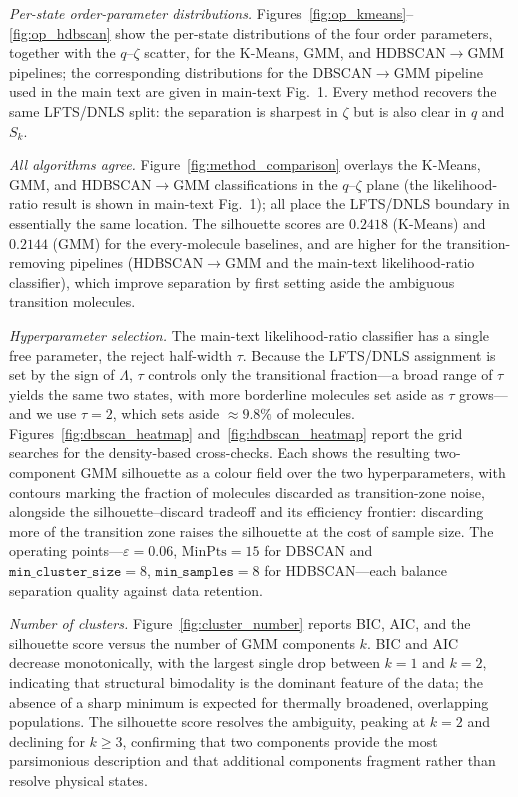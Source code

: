 \documentclass[aps,amsmath,amssymb,onecolumn,superscriptaddress,nofootinbib]{revtex4-2}
\begin{document}
\emph{Per-state order-parameter distributions.}
Figures~\ref{fig:op_kmeans}--\ref{fig:op_hdbscan} show the per-state
distributions of the four order parameters, together with the $q$--$\zeta$
scatter, for the K-Means, GMM, and HDBSCAN$\rightarrow$GMM pipelines; the
corresponding distributions for the DBSCAN$\rightarrow$GMM pipeline used in the
main text are given in main-text Fig.~1. Every method recovers the same
LFTS/DNLS split: the separation is sharpest in $\zeta$ but is also clear in $q$
and $S_k$.

\emph{All algorithms agree.}
Figure~\ref{fig:method_comparison} overlays the K-Means, GMM, and
HDBSCAN$\rightarrow$GMM classifications in the $q$--$\zeta$ plane (the
likelihood-ratio result is shown in main-text Fig.~1); all place the
LFTS/DNLS boundary in essentially the same location. The silhouette scores
are $0.2418$ (K-Means) and $0.2144$ (GMM) for the every-molecule baselines, and
are higher for the transition-removing pipelines (HDBSCAN$\rightarrow$GMM and the
main-text likelihood-ratio classifier), which improve separation by first setting
aside the ambiguous transition molecules.


\emph{Hyperparameter selection.}
The main-text likelihood-ratio classifier has a single free parameter, the
reject half-width $\tau$. Because the LFTS/DNLS assignment is set by the sign of
$\Lambda$, $\tau$ controls only the transitional fraction---a broad range of
$\tau$ yields the same two states, with more borderline molecules set aside as
$\tau$ grows---and we use $\tau=2$, which sets aside $\approx 9.8\%$ of molecules.
Figures~\ref{fig:dbscan_heatmap} and~\ref{fig:hdbscan_heatmap} report the grid
searches for the density-based cross-checks. Each shows the resulting
two-component GMM silhouette as a colour field over the two hyperparameters,
with contours marking the fraction of molecules discarded as transition-zone
noise, alongside the silhouette--discard tradeoff and its efficiency frontier:
discarding more of the transition zone raises the silhouette at the cost of
sample size. The operating points---$\varepsilon=0.06$, $\mathrm{MinPts}=15$
for DBSCAN and $\mathtt{min\_cluster\_size}=8$, $\mathtt{min\_samples}=8$ for
HDBSCAN---each balance separation quality against data retention.


\emph{Number of clusters.}
Figure~\ref{fig:cluster_number} reports BIC, AIC, and the silhouette score
versus the number of GMM components $k$. BIC and AIC decrease monotonically, with
the largest single drop between $k=1$ and $k=2$, indicating that structural
bimodality is the dominant feature of the data; the absence of a sharp minimum
is expected for thermally broadened, overlapping populations. The silhouette
score resolves the ambiguity, peaking at $k=2$ and declining for $k\geq 3$,
confirming that two components provide the most parsimonious description and that
additional components fragment rather than resolve physical states.
\end{document}
